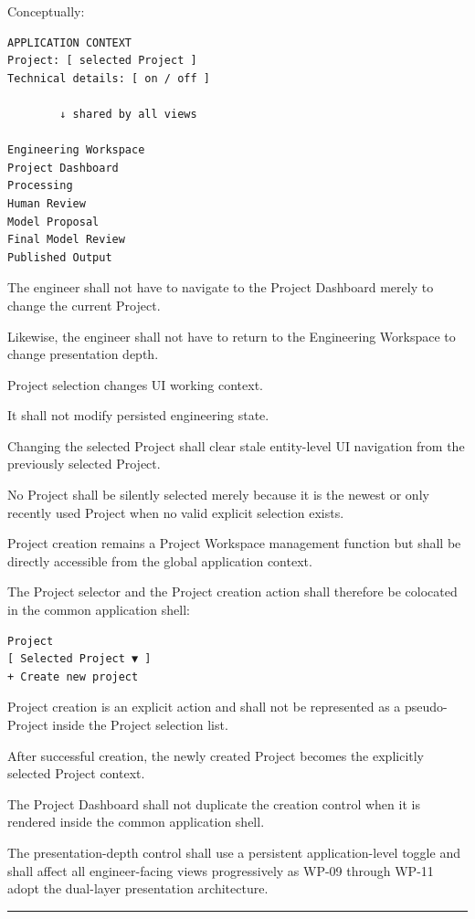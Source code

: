 Conceptually:

\begin{verbatim}
APPLICATION CONTEXT
Project: [ selected Project ]
Technical details: [ on / off ]

        ↓ shared by all views

Engineering Workspace
Project Dashboard
Processing
Human Review
Model Proposal
Final Model Review
Published Output
\end{verbatim}

The engineer shall not have to navigate to the Project Dashboard merely to change the current Project.

Likewise, the engineer shall not have to return to the Engineering Workspace to change presentation depth.

Project selection changes UI working context.

It shall not modify persisted engineering state.

Changing the selected Project shall clear stale entity-level UI navigation from the previously selected Project.

No Project shall be silently selected merely because it is the newest or only recently used Project when no valid explicit selection exists.

Project creation remains a Project Workspace management function but shall be directly accessible from the global application context.

The Project selector and the Project creation action shall therefore be colocated in the common application shell:

\begin{verbatim}
Project
[ Selected Project ▼ ]
+ Create new project
\end{verbatim}

Project creation is an explicit action and shall not be represented as a pseudo-Project inside the Project selection list.

After successful creation, the newly created Project becomes the explicitly selected Project context.

The Project Dashboard shall not duplicate the creation control when it is rendered inside the common application shell.

The presentation-depth control shall use a persistent application-level toggle and shall affect all engineer-facing views progressively as WP-09 through WP-11 adopt the dual-layer presentation architecture.

\begin{center}\rule{0.5\linewidth}{0.5pt}\end{center}


